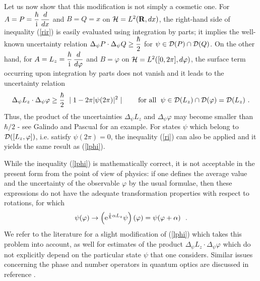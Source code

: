 \documentclass[a4wide,12pt]{report}
\begin{document}
Let us now show that this modification is not simply a cosmetic one. 
For 
$A=P= \displaystyle{\hbar \over {\rm i}} \, \displaystyle{d \over dx}$ and $B=Q=x$
 on ${\cal H} = L^2 ( {\bf R}, dx)$, the right-hand side of inequality 
(\ref{rir}) is easily evaluated using integration by parts;  
it implies the well-known uncertainty relation 
$\Delta_{\psi} P \cdot
\Delta_{\psi} Q \geq \displaystyle{\hbar  \over 2}$ for  $\psi \in
{\cal D}(P) \cap {\cal D}(Q)$.
On the other hand, for 
$A= L_z = \displaystyle{\hbar \over {\rm i}} \, \displaystyle{d \over
d\varphi}$ and $B=\varphi$
 on ${\cal H} = L^2 ( [0,2\pi ] , d\varphi )$, the surface term 
 occurring upon integration by parts does not vanish and it leads
 to the uncertainty relation 
\begin{equation}
\label{lphi}
\Delta_{\psi} L_z \cdot
\Delta_{\psi} \varphi \geq \displaystyle{\hbar  \over 2}
\ \mid 1 - 2 \pi | \psi (2 \pi ) | ^2 \mid \qquad
\mbox{for all} \ \; \psi \in {\cal D}(L_z) \cap {\cal D}(\varphi)
= {\cal D} (L_z)
\ .
\end{equation}
Thus, the product of the uncertainties 
$\Delta_{\psi} L_z$ and 
$\Delta_{\psi} \varphi$ 
may become smaller than 
$\hbar /2$
- see Galindo and Pascual \cite{gap} for an example. 
For states   
$\psi$ which belong to ${\cal D} ([L_z , \varphi ] )$, i.e. 
satisfy 
$\psi (2 \pi )=0$, the inequality  (\ref{ri}) 
can also be applied and it yields the same result as (\ref{lphi}).
 
While the inequality (\ref{lphi}) is mathematically correct, 
it is not acceptable in the present 
form from the point of view of physics: 
if one defines the average value and the uncertainty of the observable 
$\varphi$ by the usual formulae, then 
these expressions do not have the 
adequate transformation properties with respect to rotations,
for which 
\[
\psi (\varphi ) \to 
\left( {\rm e} ^{ {{\rm i} \over \hbar} \alpha L_z }  \psi \right) 
(\varphi )
= \psi (\varphi + \alpha)
\ \ .
\]
We refer to the literature 
\cite{ju,krau}
for a slight modification of (\ref{lphi})
 which takes this problem into account, as well for 
estimates of the product  
$\Delta_{\psi} L_z \cdot
\Delta_{\psi} \varphi$ 
which do not explicitly depend on the particular state 
$\psi$ that one considers. 
Similar issues concerning the phase and number operators 
in quantum optics are discussed in reference \cite{car}. 
 
 
\bigskip
 
\end{document}
